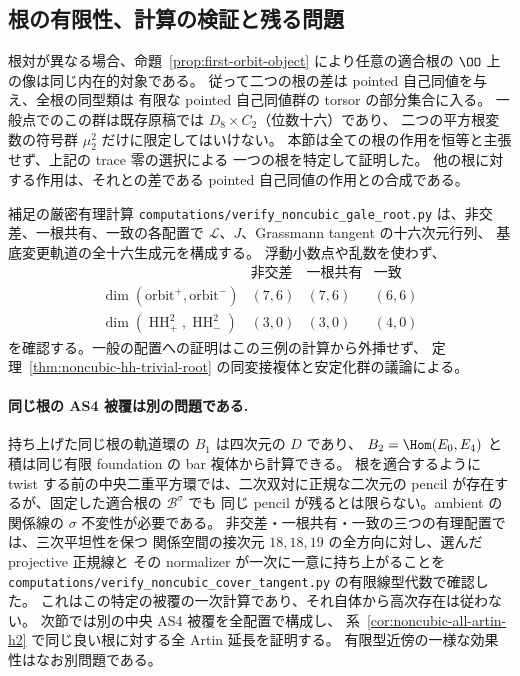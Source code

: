 \subsection{根の有限性、計算の検証と残る問題}

根対が異なる場合、命題~\ref{prop:first-orbit-object} により任意の適合根の
$\OO$ 上の像は同じ内在的対象である。
従って二つの根の差は pointed 自己同値を与え、全根の同型類は
有限な pointed 自己同値群の torsor の部分集合に入る。
一般点でのこの群は既存原稿では $D_8\times C_2$（位数十六）であり、
二つの平方根変数の符号群 $\mu_2^2$ だけに限定してはいけない。
本節は全ての根の作用を恒等と主張せず、上記の trace 零の選択による
一つの根を特定して証明した。
他の根に対する作用は、それとの差である pointed 自己同値の作用との合成である。

補足の厳密有理計算
\texttt{computations/verify\_noncubic\_gale\_root.py} は、非交差、一根共有、一致の各配置で
$\mathscr L$、$J$、Grassmann tangent の十六次元行列、
基底変更軌道の全十六生成元を構成する。
浮動小数点や乱数を使わず、
\[
\begin{array}{c|ccc}
 &\text{非交差}&\text{一根共有}&\text{一致}\\\hline
\dim(\text{orbit}^+,\text{orbit}^-)&(7,6)&(7,6)&(6,6)\\
\dim(\operatorname{HH}^2_+,\operatorname{HH}^2_-)&(3,0)&(3,0)&(4,0)
\end{array}
\]
を確認する。一般の配置への証明はこの三例の計算から外挿せず、
定理~\ref{thm:noncubic-hh-trivial-root} の同変接複体と安定化群の議論による。

\paragraph{同じ根の AS4 被覆は別の問題である.}
持ち上げた同じ根の軌道環の $B_1$ は四次元の $D$ であり、
$B_2=\Hom(E_0,E_4)$ と積は同じ有限 foundation の bar 複体から計算できる。
根を適合するように twist する前の中央二重平方環では、二次双対に正規な二次元の
pencil が存在するが、固定した適合根の $\mathcal B^\sigma$ でも
同じ pencil が残るとは限らない。ambient の関係線の $\sigma$ 不変性が必要である。
非交差・一根共有・一致の三つの有理配置では、三次平坦性を保つ
関係空間の接次元 $18,18,19$ の全方向に対し、選んだ projective 正規線と
その normalizer が一次に一意に持ち上がることを
\texttt{computations/verify\_noncubic\_cover\_tangent.py} の有限線型代数で確認した。
これはこの特定の被覆の一次計算であり、それ自体から高次存在は従わない。
次節では別の中央 AS4 被覆を全配置で構成し、
系~\ref{cor:noncubic-all-artin-h2} で同じ良い根に対する全 Artin 延長を証明する。
有限型近傍の一様な効果性はなお別問題である。
